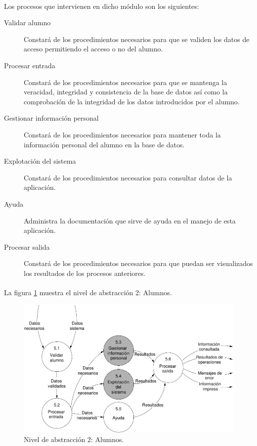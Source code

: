 \paragraph{}Los procesos que intervienen en dicho módulo son los siguientes:

\begin{description}
 \item[Validar alumno] Constará de los procedimientos necesarios para que se
      validen los datos de acceso permitiendo el acceso o no del alumno.
 \item[Procesar entrada] Constará de los procedimientos necesarios para que se
      mantenga la veracidad, integridad y consistencia de la base de datos así
      como la comprobación de la integridad de los datos introducidos por el
      alumno.
 \item[Gestionar información personal] Constará de los procedimientos necesarios
      para mantener toda la información personal del alumno en la base de datos.
 \item[Explotación del sistema]  Constará de los procedimientos necesarios para
      consultar datos de la aplicación.
 \item[Ayuda] Administra la documentación que sirve de ayuda en el manejo de
      esta aplicación.
 \item[Procesar salida] Constará de los procedimientos necesarios para que
      puedan ser visualizados los resultados de los procesos anteriores.
\end{description}

\paragraph{}La figura \ref{diagramaNivel2-Alumnos} muestra el nivel de
abstracción 2: Alumnos.

  \begin{figure}[!ht]
    \begin{center}
      \includegraphics[]{08.Analisis_Funcional/8.2.DFDs/Niveles/Nivel2/Diagramas/nivel2-Alumnos.pdf}
      \caption{Nivel de abstracción 2: Alumnos.}
      \label{diagramaNivel2-Alumnos}
    \end{center}
  \end{figure}